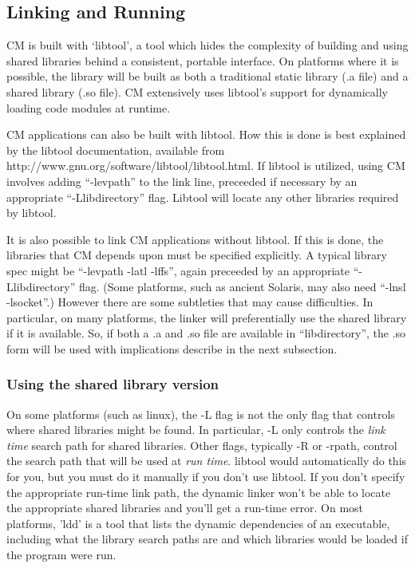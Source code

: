 \documentclass[11pt]{article}
\begin{document}
\subsection{Linking and Running}
CM is built with `libtool', a tool which hides the complexity of building
and using shared libraries behind a consistent, portable interface. On
platforms where it is possible, the  library will be built as both a
traditional static library (.a file) and a shared library (.so file). 
CM extensively uses libtool's support for dynamically loading code modules
at runtime.  

CM applications can also be built with libtool. How this is done is best
explained by the libtool documentation, available from
http://www.gnu.org/software/libtool/libtool.html.  If libtool is utilized,
using CM involves adding ``-levpath'' to the link  line, preceeded if necessary
by an appropriate ``-Llibdirectory'' flag.  Libtool will locate any other
libraries required by libtool.  

It is also possible to link CM applications without libtool. If this is
done, the libraries that CM depends upon must be specified explicitly. A
typical library spec might be ``-levpath -latl -lffs'', again preceeded by an
appropriate ``-Llibdirectory'' flag.  (Some platforms, such as ancient
Solaris, may also need ``-lnsl -lsocket''.)
However there are some subtleties that
may cause difficulties. In particular, on many platforms, the linker will
preferentially use the shared library if it is available. So, if both a .a
and .so file are available in ``libdirectory'', the .so form will be used
with implications describe in the next subsection.

\subsubsection{Using the shared library version}
On some platforms (such as linux), the -L flag is not the only flag that
controls where shared libraries might be found. In particular, -L only
controls the {\it link time} search path for shared libraries. Other flags,
typically -R or -rpath, control the search path that will be used at {\it run time}.
libtool would automatically do this for you, but you must do it manually
if you don't use libtool. If you don't specify the appropriate run-time
link path, the dynamic linker won't be able to locate the appropriate shared
libraries and you'll get a run-time error. On most platforms, 'ldd' is
a tool that lists the dynamic dependencies of an executable, including
what the library search paths are and which libraries would be loaded if
the program were run.
\end{document}
